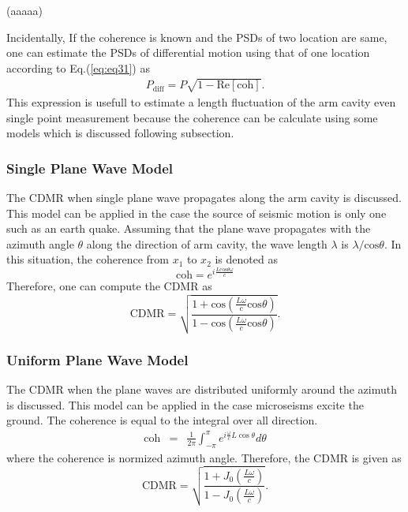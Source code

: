 \documentclass[a4paper,12pt]{book}
\begin{document}
(aaaaa)

Incidentally, If the coherence is known and the PSDs of two location are same, one can estimate the PSDs of differential motion using that of one location according to Eq.(\ref{eq:eq31}) as
\begin{eqnarray}
  P_\mathrm{diff} = P \sqrt{1 - \mathrm{Re[coh]}}. \label{eq:eq34}
\end{eqnarray}
This expression is usefull to estimate a length fluctuation of the arm cavity even single point measurement because the coherence can be calculate using some models which is discussed following subsection.

\subsubsection{Single Plane Wave Model}
The CDMR when single plane wave propagates along the arm cavity is discussed. This model can be applied in the case the source of seismic motion is only one such as an earth quake. Assuming that the plane wave propagates with the azimuth angle $\theta$ along the direction of arm cavity, the wave length $\lambda$ is $\lambda/\mathrm{cos}\theta$. In this situation, the coherence from $x_1$ to $x_2$ is denoted as
\begin{equation}
  \mathrm{coh}=e^{i\frac{L\mathrm{cos}\theta\omega}{c}}
\end{equation}
Therefore, one can compute the CDMR as
\begin{equation}  \label{eq:eq18}
  \mathrm{CDMR} = \sqrt{\frac{1+\mathrm{cos}(\frac{L\omega}{c}\mathrm{cos}\theta)}{1-\mathrm{cos}(\frac{L\omega}{c}\mathrm{cos}\theta)}}.
\end{equation}


\subsubsection{Uniform Plane Wave Model}
The CDMR when the plane waves are distributed uniformly around the azimuth is discussed. This model can be applied in the case microseisms excite the ground. The coherence is equal to the integral over all direction.
\begin{eqnarray} \label{eq:eq19}
  \mathrm{coh} &=& \frac{1}{2\pi} \int_{-\pi}^{\pi} e^{i\frac{\omega}{c} L\cos \theta} d \theta
\end{eqnarray}
where the coherence is normized azimuth angle. Therefore, the CDMR is given as
\begin{equation}  \label{eq:eq20}
  \mathrm{CDMR} = \sqrt{\frac{1+J_0(\frac{L\omega}{c})}{1-J_0(\frac{L\omega}{c})}} .
\end{equation}
\end{document}

